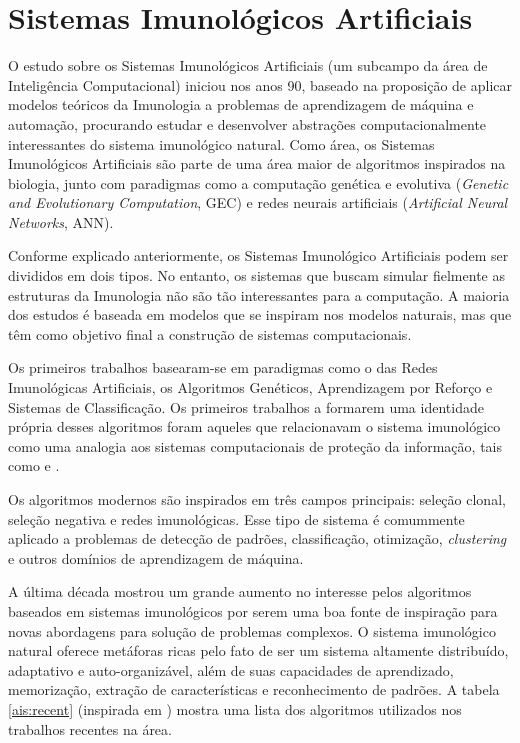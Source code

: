 \chapter{Sistemas Imunológicos Artificiais}

O estudo sobre os Sistemas Imunológicos Artificiais (um subcampo da área de Inteligência Computacional) iniciou nos anos 90, baseado na proposição de aplicar modelos teóricos da Imunologia a problemas de aprendizagem de máquina e automação, procurando estudar e desenvolver abstrações computacionalmente interessantes do sistema imunológico natural. Como área, os Sistemas Imunológicos Artificiais são parte de uma área maior de algoritmos inspirados na biologia, junto com paradigmas como a computação genética e evolutiva (\emph{Genetic and Evolutionary Computation}, GEC) e redes neurais artificiais (\emph{Artificial Neural Networks}, ANN).

Conforme explicado anteriormente, os Sistemas Imunológico Artificiais podem ser divididos em dois tipos. No entanto, os sistemas que buscam simular fielmente as estruturas da Imunologia não são tão interessantes para a computação. A maioria dos estudos é baseada em modelos que se inspiram nos modelos naturais, mas que têm como objetivo final a construção de sistemas computacionais.

Os primeiros trabalhos basearam-se em paradigmas como o das Redes Imunológicas Artificiais, os Algoritmos Genéticos, Aprendizagem por Reforço e Sistemas de Classificação. Os primeiros trabalhos a formarem uma identidade própria desses algoritmos foram aqueles que relacionavam o sistema imunológico como uma analogia aos sistemas computacionais de proteção da informação, tais como \citet{Forrest1994} e \citet{Forrest1997}.

Os algoritmos modernos são inspirados em três campos principais: seleção clonal, seleção negativa e redes imunológicas. Esse tipo de sistema é comummente aplicado a problemas de detecção de padrões, classificação, otimização, \emph{clustering} e outros domínios de aprendizagem de máquina.

A última década mostrou um grande aumento no interesse pelos algoritmos baseados em sistemas imunológicos por serem uma boa fonte de inspiração para novas abordagens para solução de problemas complexos. O sistema imunológico natural oferece metáforas ricas pelo fato de ser um sistema altamente distribuído, adaptativo e auto-organizável, além de suas capacidades de aprendizado, memorização, extração de características e reconhecimento de padrões. A tabela \ref{ais:recent} (inspirada em \citet{Dasgupta2010}) mostra uma lista dos algoritmos utilizados nos trabalhos recentes na área.

